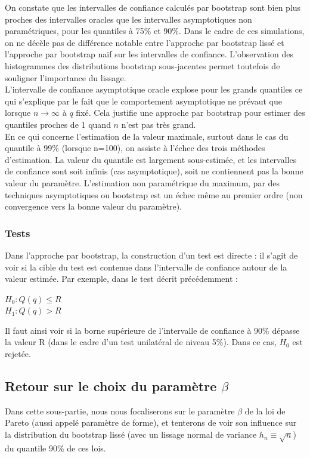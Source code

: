 \documentclass{article}
\renewcommand*{\(}{ \left( }
\renewcommand*{\)}{ \right) }
\begin{document}
On constate que les intervalles de confiance calculés par bootstrap sont bien plus proches des intervalles oracles que les intervalles asymptotiques non paramétriques, pour les quantiles à 75\% et 90\%. Dans le cadre de ces simulations, on ne décèle pas de différence notable entre l'approche par bootstrap lissé et l'approche par bootstrap naïf sur les intervalles de confiance. L'observation des histogrammes des distributions bootstrap sous-jacentes permet toutefois de souligner l'importance du lissage.\\
L'intervalle de confiance asymptotique oracle explose pour les grands quantiles ce qui s'explique par le fait que le comportement asymptotique ne prévaut que lorsque $n \rightarrow \infty$ à $q$ fixé. Cela justifie une approche par bootstrap pour estimer des quantiles proches de 1 quand $n$ n'est pas très grand.\\
En ce qui concerne l'estimation de la valeur maximale, surtout dans le cas du quantile à 99\% (lorsque n=100), on assiste à l'échec des trois méthodes d'estimation. La valeur du quantile est largement sous-estimée, et les intervalles de confiance sont soit infinis (cas asymptotique), soit ne contiennent pas la bonne valeur du paramètre. L'estimation non paramétrique du maximum, par des techniques asymptotiques ou bootstrap est un échec même au premier ordre (non convergence vers la bonne valeur du paramètre).\\

\subsubsection{Tests}

Dans l'approche par bootstrap, la construction d'un test est directe : il s'agit de voir si la cible du test est contenue dans l'intervalle de confiance autour de la valeur estimée. Par exemple, dans le test décrit précédemment :
\begin{center}
$H_0 : Q(q) \leq R$\\
$H_1 : Q(q) > R$\\
\end{center}
Il faut ainsi voir si la borne supérieure de l'intervalle de confiance à 90\% dépasse la valeur R (dans le cadre d'un test unilatéral de niveau 5\%). Dans ce cas, $H_0$ est rejetée.


\subsection{Retour sur le choix du paramètre $\beta$}
Dans cette sous-partie, nous nous focaliserons sur le paramètre $\beta$ de la loi de Pareto (aussi appelé paramètre de forme), et tenterons de voir son influence sur la distribution du bootstrap lissé (avec un lissage normal de variance $h_n \equiv \sqrt{n}$) du quantile 90\% de ces lois.
\end{document}
